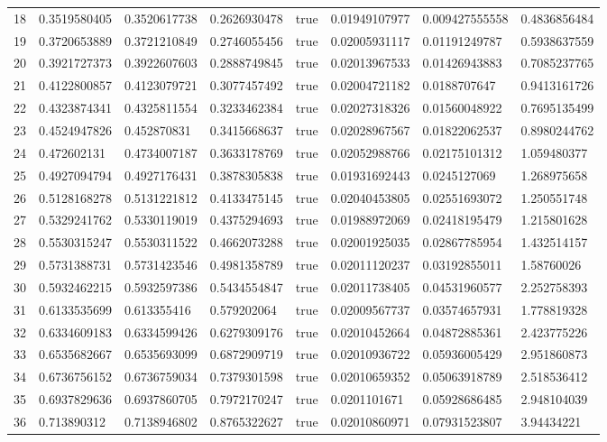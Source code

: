 \begin{tabular}{@{}llllllll@{}}
18 & 0.3519580405 & 0.3520617738 & 0.2626930478 & true & 0.01949107977 & 0.009427555558 & 0.4836856484 \\
19 & 0.3720653889 & 0.3721210849 & 0.2746055456 & true & 0.02005931117 & 0.01191249787 & 0.5938637559 \\
20 & 0.3921727373 & 0.3922607603 & 0.2888749845 & true & 0.02013967533 & 0.01426943883 & 0.7085237765 \\
21 & 0.4122800857 & 0.4123079721 & 0.3077457492 & true & 0.02004721182 & 0.0188707647 & 0.9413161726 \\
22 & 0.4323874341 & 0.4325811554 & 0.3233462384 & true & 0.02027318326 & 0.01560048922 & 0.7695135499 \\
23 & 0.4524947826 & 0.452870831 & 0.3415668637 & true & 0.02028967567 & 0.01822062537 & 0.8980244762 \\
24 & 0.472602131 & 0.4734007187 & 0.3633178769 & true & 0.02052988766 & 0.02175101312 & 1.059480377 \\
25 & 0.4927094794 & 0.4927176431 & 0.3878305838 & true & 0.01931692443 & 0.0245127069 & 1.268975658 \\
26 & 0.5128168278 & 0.5131221812 & 0.4133475145 & true & 0.02040453805 & 0.02551693072 & 1.250551748 \\
27 & 0.5329241762 & 0.5330119019 & 0.4375294693 & true & 0.01988972069 & 0.02418195479 & 1.215801628 \\
28 & 0.5530315247 & 0.5530311522 & 0.4662073288 & true & 0.02001925035 & 0.02867785954 & 1.432514157 \\
29 & 0.5731388731 & 0.5731423546 & 0.4981358789 & true & 0.02011120237 & 0.03192855011 & 1.58760026 \\
30 & 0.5932462215 & 0.5932597386 & 0.5434554847 & true & 0.02011738405 & 0.04531960577 & 2.252758393 \\
31 & 0.6133535699 & 0.613355416 & 0.579202064 & true & 0.02009567737 & 0.03574657931 & 1.778819328 \\
32 & 0.6334609183 & 0.6334599426 & 0.6279309176 & true & 0.02010452664 & 0.04872885361 & 2.423775226 \\
33 & 0.6535682667 & 0.6535693099 & 0.6872909719 & true & 0.02010936722 & 0.05936005429 & 2.951860873 \\
34 & 0.6736756152 & 0.6736759034 & 0.7379301598 & true & 0.02010659352 & 0.05063918789 & 2.518536412 \\
35 & 0.6937829636 & 0.6937860705 & 0.7972170247 & true & 0.0201101671 & 0.05928686485 & 2.948104039 \\
36 & 0.713890312 & 0.7138946802 & 0.8765322627 & true & 0.02010860971 & 0.07931523807 & 3.94434221 \\

\end{tabular}
